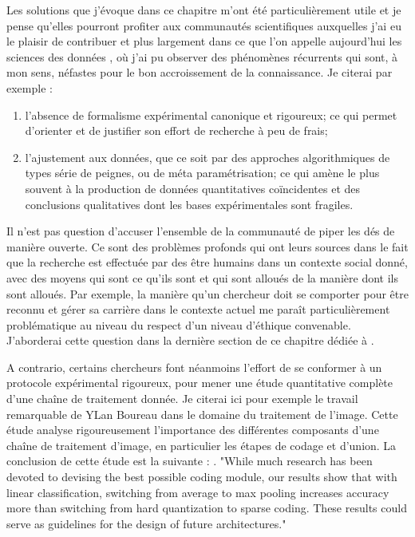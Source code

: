 Les solutions que j'évoque dans ce chapitre m'ont été particulièrement utile et je pense qu'elles pourront profiter aux communautés scientifiques auxquelles j'ai eu le plaisir de contribuer et plus largement dans ce que l'on appelle aujourd'hui \og les sciences des données \fg, où j'ai pu observer des phénomènes récurrents qui sont, à mon sens, néfastes pour le bon accroissement de la connaissance. Je citerai par exemple :
\begin{enumerate}
  \item l'absence de formalisme expérimental canonique et rigoureux; ce qui permet d'orienter et de justifier son effort de recherche à peu de frais;
  \item l'ajustement aux données, que ce soit par des approches algorithmiques de types série de peignes, ou de méta paramétrisation; ce qui amène le plus souvent à la production de données quantitatives coïncidentes et des conclusions qualitatives dont les bases expérimentales sont fragiles.
\end{enumerate}

Il n'est pas question d'accuser l'ensemble de la communauté de \og piper les dés \fg de manière ouverte. Ce sont des problèmes profonds qui ont leurs sources dans le fait que la recherche est effectuée par des être humains dans un contexte social donné, avec des moyens qui sont ce qu'ils sont et qui sont alloués de la manière dont ils sont alloués. Par exemple, la manière qu'un chercheur doit se comporter pour être reconnu et gérer sa carrière dans le contexte actuel me paraît particulièrement problématique au niveau du respect d'un niveau d'éthique convenable. J'aborderai cette question dans la dernière section de ce chapitre dédiée à .

A contrario, certains chercheurs font néanmoins l'effort de se conformer à un protocole expérimental rigoureux, pour mener une étude quantitative complète d'une chaîne de traitement donnée. Je citerai ici pour exemple le travail remarquable de YLan Boureau dans le domaine du traitement de l'image\cite{boureau2010learning}. Cette étude analyse rigoureusement l'importance des différentes composants d'une chaîne de traitement d'image, en particulier les étapes de codage et d'union. La conclusion de cette étude est la suivante : . "While much research has been devoted to devising
the best possible coding module, our results show that with
linear classification, switching from average to max pooling
increases accuracy more than switching from hard quantization to sparse coding. These results could serve as guidelines for the design of future architectures."

